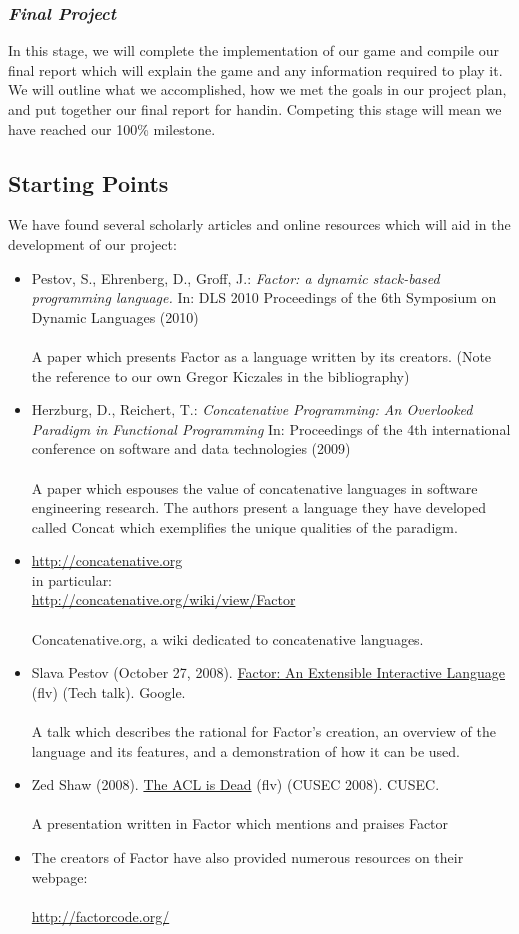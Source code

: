 \documentclass{sig-alternate}
\begin{document}
\subsubsection*{\textit{Final Project}} In this stage, we will complete
the implementation of our game and compile our final report which
will explain the game and any information required to play it. We
will outline what we accomplished, how we met the goals in our
project plan, and put together our final report for handin. Competing
this stage will mean we have reached our 100\% milestone.

\subsection{Starting Points}
We have found several scholarly articles and online resources
which will aid in the development of our project:

\begin{itemize}
\item Pestov, S., Ehrenberg, D., Groff, J.: \textit{Factor: a dynamic stack-based programming
language.} In: DLS 2010 Proceedings of the 6th Symposium on Dynamic Languages
(2010)\\\\A paper which presents Factor as a language written by its creators. (Note the
reference to our own Gregor Kiczales in the bibliography)
\item Herzburg, D., Reichert, T.: \textit{Concatenative Programming:
An Overlooked Paradigm in Functional Programming} In: Proceedings of the 4th
international conference on software and data technologies (2009)
\\\\A paper which espouses the value of concatenative languages in software engineering 
research. The authors present a language they have developed called Concat which exemplifies the unique qualities of the paradigm.
\item \url{http://concatenative.org}\\
in particular:\\\url{http://concatenative.org/wiki/view/Factor}\\\\Concatenative.org, a wiki dedicated to concatenative languages.
\item Slava Pestov (October 27, 2008). \href{http://youtu.be/f_0QlhYlS8g}{Factor: An Extensible Interactive Language} (flv) (Tech talk). Google.\\\\A talk which describes the rational for Factor's creation, an overview of the language and its features, and a demonstration of how it can be used.
\item Zed Shaw (2008). \href{http://vimeo.com/2723800}{The ACL is Dead} (flv) (CUSEC 2008). CUSEC.\\\\
A presentation written in Factor which mentions and praises Factor
\item The creators of Factor have also provided numerous resources on their webpage:\\\\\url{http://factorcode.org/}
\end{itemize}
\end{document}
